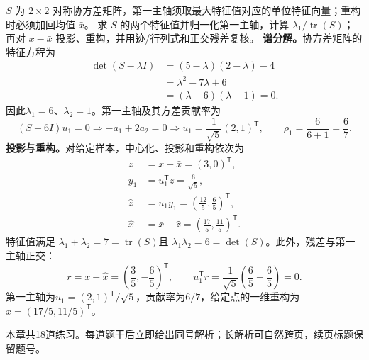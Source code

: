 \begin{solution}
\SolGiven $S$ 为 $2\times2$ 对称协方差矩阵，第一主轴须取最大特征值对应的单位特征向量；重构时必须加回均值 $\bar x$。
\SolPlan 求 $S$ 的两个特征值并归一化第一主轴，计算 $\lambda_1/\operatorname{tr}(S)$；再对 $x-\bar x$ 投影、重构，并用迹/行列式和正交残差复核。
\SolDerive
\textbf{谱分解。}协方差矩阵的特征方程为
\[
\begin{aligned}
\det(S-\lambda I)
&=(5-\lambda)(2-\lambda)-4\\
&=\lambda^2-7\lambda+6\\
&=(\lambda-6)(\lambda-1)=0.
\end{aligned}
\]
因此$\lambda_1=6$、$\lambda_2=1$。第一主轴及其方差贡献率为
\[
(S-6I)u_1=0
\Longrightarrow -a_1+2a_2=0
\Longrightarrow u_1=\frac{1}{\sqrt5}(2,1)^{\mathsf T},
\qquad
\rho_1=\frac{6}{6+1}=\frac67.
\]
\textbf{投影与重构。}对给定样本，中心化、投影和重构依次为
\[
\begin{aligned}
z&=x-\bar x=(3,0)^{\mathsf T},\\
y_1&=u_1^{\mathsf T}z=\frac6{\sqrt5},\\
\widehat z&=u_1y_1=\left(\frac{12}{5},\frac65\right)^{\mathsf T},\\
\widehat x&=\bar x+\widehat z
=\left(\frac{17}{5},\frac{11}{5}\right)^{\mathsf T}.
\end{aligned}
\]
\SolCheck 特征值满足
$\lambda_1+\lambda_2=7=\operatorname{tr}(S)$且
$\lambda_1\lambda_2=6=\det(S)$。此外，残差与第一主轴正交：
\[
r=x-\widehat x=\left(\frac35,-\frac65\right)^{\mathsf T},
\qquad
u_1^{\mathsf T}r
=\frac1{\sqrt5}\left(\frac65-\frac65\right)=0.
\]
\SolAnswer 第一主轴为$u_1=(2,1)^{\mathsf T}/\sqrt5$，贡献率为$6/7$，给定点的一维重构为
$\widehat x=(17/5,11/5)^{\mathsf T}$。
\end{solution}

\label{struct:V4-C04-CH34}
\begin{chapterexercisebox}
\label{struct:V4-C04-CH35}
本章共18道练习。每道题干后立即给出同号解析；长解析可自然跨页，续页标题保留题号。
\end{chapterexercisebox}

